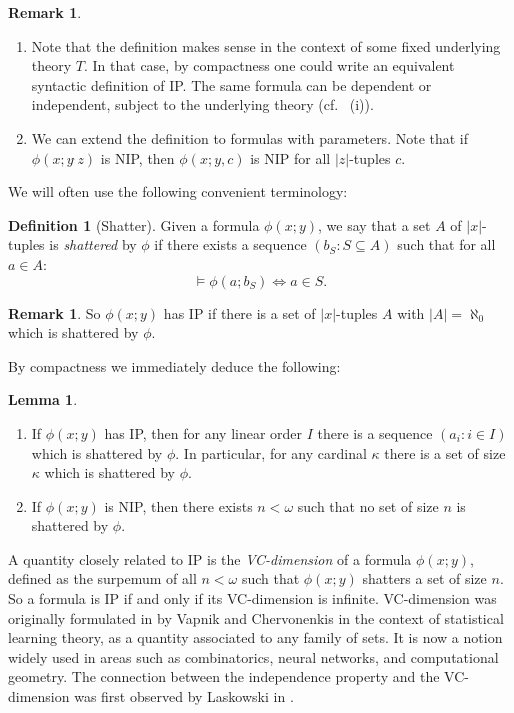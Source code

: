 \documentclass[a4paper]{report}
\newcommand{\ind}{\hspace{15pt}}
\newcommand{\tophat}{\hat{\phantom{.}}}
\renewcommand{\iff}{\Leftrightarrow}
\theoremstyle{definition}
\newtheorem{lem}[thm]{Lemma}
\newtheorem{defn}[thm]{Definition}
\theoremstyle{remstyle}
\newtheorem{rem}[thm]{Remark}
\begin{document}
\begin{rem}\
	\begin{enumerate}
		\item Note that the definition makes sense in the context of some fixed underlying theory $T$. In that case, by compactness one could write an equivalent syntactic definition of IP. The same formula can be dependent or independent, subject to the underlying theory (cf.\  (i)).

		\item We can extend the definition to formulas with parameters. Note that if  $\phi(x;y\tophat z)$ is NIP, then $\phi(x;y,c)$ is NIP for all $|z|$-tuples $c$.
	\end{enumerate}
\end{rem}

\ind We will often use the following convenient terminology:

\begin{defn}[Shatter]
	Given a formula $\phi(x;y)$, we say that a set $A$ of $|x|$-tuples is \emph{shattered} by $\phi$ if there exists a sequence $(b_S: S\subseteq A)$ such that for all $a\in A$:
	\begin{equation*}
		\models \phi(a;b_S) \iff a\in S.
	\end{equation*}
\end{defn}

\begin{rem}
	So $\phi(x;y)$ has IP if there is a set of $|x|$-tuples $A$ with $|A|=\aleph_0$ which is shattered by $\phi$.
\end{rem}

\ind By compactness we immediately deduce the following:

\begin{lem}\label{ipcomp}\
	\begin{enumerate}
		\item If $\phi(x;y)$ has IP, then for any linear order $I$ there is a sequence $(a_i:i\in I)$ which is shattered by $\phi$. In particular, for any cardinal $\kappa$ there is a set of size $\kappa$ which is shattered by $\phi$.
		\item If $\phi(x;y)$ is NIP, then there exists $n<\omega$ such that no set of size $n$ is shattered by $\phi$.
	\end{enumerate}
\end{lem}

\ind A quantity closely related to IP is the \emph{VC-dimension} of a formula $\phi(x;y)$, defined as the surpemum of all $n<\omega$ such that $\phi(x;y)$ shatters a set of size $n$. So a formula is IP if and only if its VC-dimension is infinite. VC-dimension was originally formulated in \cite{VC} by Vapnik and Chervonenkis in the context of statistical learning theory, as a quantity associated to any family of sets. It is now a notion widely used in areas such as combinatorics, neural networks, and computational geometry. The connection between the independence property and the VC-dimension was first observed by Laskowski in \cite{VC 2}.
\end{document}
